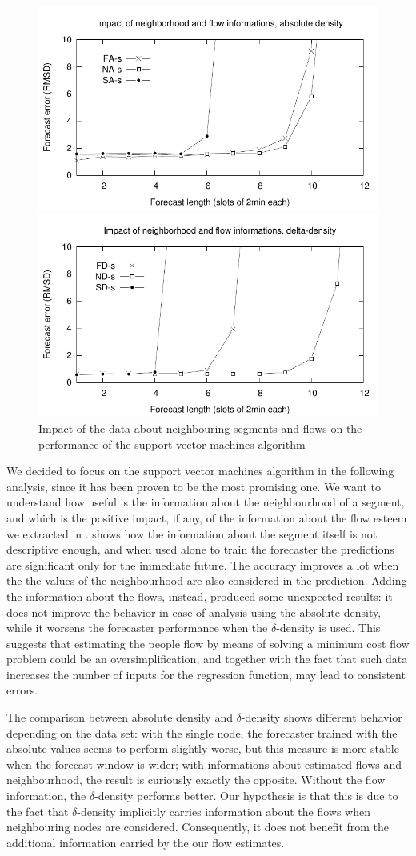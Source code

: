 \documentclass[12pt,a4paper,twoside,openright]{book}
\begin{document}
\begin{figure}
\parbox{0.5\columnwidth}{\includegraphics[width=0.49\columnwidth]{img/flow-a}}
\parbox{0.5\columnwidth}{\includegraphics[width=0.49\columnwidth]{img/flow-d}}
\caption[Utility of neighbouring segments data]{Impact of the data about neighbouring segments and flows on the performance of the support vector machines algorithm}
\label{img:flows}
\end{figure}
%
We decided to focus on the support vector machines algorithm in the following analysis, since it has been proven to be the most promising one.
%
We want to understand how useful is the information about the neighbourhood of a segment, and which is the positive impact, if any, of the information about the flow esteem we extracted in .
%
 shows how the information about the segment itself is not descriptive enough, and when used alone to train the forecaster the predictions are significant only for the immediate future.
%
The accuracy improves a lot when the the values of the neighbourhood are also considered in the prediction.
%
Adding the information about the flows, instead, produced some unexpected results: it does not improve the behavior in case of analysis using the absolute density, while it worsens the forecaster performance when the $\delta$-density is used.
%
This suggests that estimating the people flow by means of solving a minimum cost flow problem could be an oversimplification, and together with the fact that such data increases the number of inputs for the regression function, may lead to consistent errors.

The comparison between absolute density and $\delta$-density shows different behavior depending on the data set: with the single node, the forecaster trained with the absolute values seems to perform slightly worse, but this measure is more stable when the forecast window is wider; with informations about estimated flows and neighbourhood, the result is curiously exactly the opposite.
%
Without the flow information, the $\delta$-density performs better.
%
Our hypothesis is that this is due to the fact that $\delta$-density implicitly carries information about the flows when neighbouring nodes are considered.
%
Consequently, it does not benefit from the additional information carried by the our flow estimates.
\end{document}

